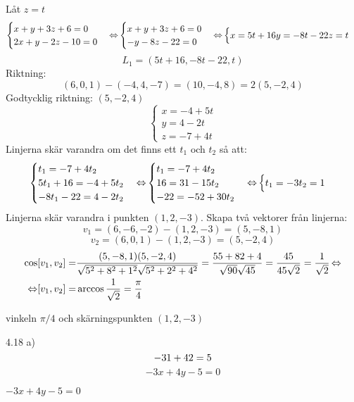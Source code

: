 \pagebreak
\begin{task}{4.17}
	Låt $z=t$
	\[\begin{cases}
		x+y+3z+6=0 \\
		2x+y-2z-10=0
	\end{cases} \operatorname{\Leftrightarrow}
	\begin{cases}
		x+y+3z+6=0 \\
		-y-8z-22=0
	\end{cases} \operatorname{\Leftrightarrow}
	\begin{cases}
		x=5t+16
		y=-8t-22
		z=t
	\end{cases}\]
	\[L_1=(5t+16,-8t-22,t)\]
	Riktning:
	\[(6,0,1)-(-4,4,-7)=(10,-4,8)=2(5,-2,4)\]
	Godtycklig riktning: $(5,-2,4)$
	\[\begin{cases}
		x=-4+5t \\
		y=4-2t \\
		z=-7+4t
	\end{cases}\]
	Linjerna skär varandra om det finns ett $t_1$ och $t_2$ så att:
	\[\begin{cases}
		t_1 = -7+4t_2 \\
		5t_1+16 = -4+5t_2 \\
		-8t_1-22 = 4-2t_2
	\end{cases} \operatorname{\Leftrightarrow}
	\begin{cases}
		t_1 = -7+4t_2 \\
		16 = 31-15t_2 \\
		-22 = -52+30t_2
	\end{cases} \operatorname{\Leftrightarrow}
	\begin{cases}
		t_1=-3
		t_2=1
	\end{cases}\]
	Linjerna skär varandra i punkten $(1,2,-3)$.
	Skapa två vektorer från linjerna:
	\[v_1=(6,-6,-2)-(1,2,-3)=(5,-8,1)\]
	\[v_2=(6,0,1)-(1,2,-3)=(5,-2,4)\]
	\begin{align*}
		\cos[v_1,v_2]=&
		\frac{(5,-8,1)\*(5,-2,4)}{\sqrt{5^2+8^2+1^2}\sqrt{5^2+2^2+4^2}}=
		\frac{5\*5+8\*2+4}{\sqrt{90}\sqrt{45}}=
		\frac{45}{45\sqrt{2}}=
		\frac{1}{\sqrt{2}} \lra \\ \lra
		[v_1,v_2]=&\arccos\frac{1}{\sqrt{2}}=\frac{\pi}{4}
	\end{align*}

	\ans vinkeln $\pi/4$ och skärningspunkten $(1,2,-3)$
\end{task}

\begin{task}{4.18 a)}
	\[-3\*1+4\*2=5\]
	\[-3x+4y-5=0\]

	\ans $-3x+4y-5=0$
\end{task}

